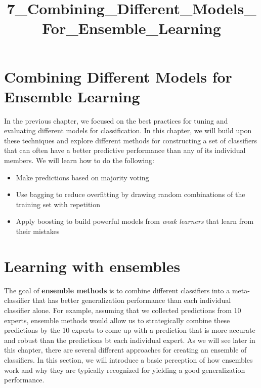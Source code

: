 \documentclass[11pt]{article}
\title{7\_Combining\_Different\_Models\_For\_Ensemble\_Learning}
\providecommand{\tightlist}{%
      \setlength{\itemsep}{0pt}\setlength{\parskip}{0pt}}
\begin{document}
    
    
    \maketitle
    
    

    
    \section{Combining Different Models for Ensemble
Learning}\label{combining-different-models-for-ensemble-learning}

    In the previous chapter, we focused on the best practices for tuning and
evaluating different models for classification. In this chapter, we will
build upon these techniques and explore different methods for
constructing a set of classifiers that can often have a better
predictive performance than any of its individual members. We will learn
how to do the following:

\begin{itemize}
\tightlist
\item
  Make predictions based on majority voting
\item
  Use bagging to reduce overfitting by drawing random combinations of
  the training set with repetition
\item
  Apply boosting to build powerful models from \emph{weak learners} that
  learn from their mistakes
\end{itemize}

    \section{Learning with ensembles}\label{learning-with-ensembles}

    The goal of \textbf{ensemble methods} is to combine different
classifiers into a meta-classifier that has better generalization
performance than each individual classifier alone. For example, assuming
that we collected predictions from 10 experts, ensemble methods would
allow us to strategically combine these predictions by the 10 experts to
come up with a prediction that is more accurate and robust than the
predictions bt each individual expert. As we will see later in this
chapter, there are several different approaches for creating an ensemble
of classifiers. In this section, we will introduce a basic perception of
how ensembles work and why they are typically recognized for yielding a
good generalization performance.
\end{document}
